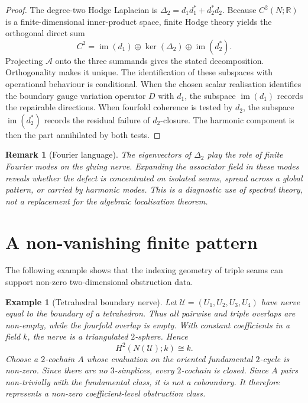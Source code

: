 \documentclass[11pt]{article}
\newtheorem{remark}[theorem]{Remark}
\newtheorem{example}[theorem]{Example}
\newcommand{\im}{\operatorname{im}}
\newcommand{\R}{\mathbb{R}}
\begin{document}
\begin{proof}
The degree-two Hodge Laplacian is \(\Delta_2=d_1d_1^*+d_2^*d_2\). Because \(C^2(N;\R)\) is a finite-dimensional inner-product space, finite Hodge theory yields the orthogonal direct sum
\[
C^2=\im(d_1)\oplus \ker(\Delta_2)\oplus \im(d_2^*).
\]
Projecting \(\mathcal A\) onto the three summands gives the stated decomposition. Orthogonality makes it unique. The identification of these subspaces with operational behaviour is conditional. When the chosen scalar realisation identifies the boundary gauge variation operator \(D\) with \(d_1\), the subspace \(\im(d_1)\) records the repairable directions. When fourfold coherence is tested by \(d_2\), the subspace \(\im(d_2^*)\) records the residual failure of \(d_2\)-closure. The harmonic component is then the part annihilated by both tests.
\end{proof}

\begin{remark}[Fourier language]
The eigenvectors of \(\Delta_2\) play the role of finite Fourier modes on the gluing nerve. Expanding the associator field in these modes reveals whether the defect is concentrated on isolated seams, spread across a global pattern, or carried by harmonic modes. This is a diagnostic use of spectral theory, not a replacement for the algebraic localisation theorem.
\end{remark}

\section{A non-vanishing finite pattern}

The following example shows that the indexing geometry of triple seams can support non-zero two-dimensional obstruction data.

\begin{example}[Tetrahedral boundary nerve]
Let \(\mathcal U=(U_1,U_2,U_3,U_4)\) have nerve equal to the boundary of a tetrahedron. Thus all pairwise and triple overlaps are non-empty, while the fourfold overlap is empty. With constant coefficients in a field \(k\), the nerve is a triangulated \(2\)-sphere. Hence
\[
H^2(N(\mathcal U);k)\cong k.
\]
Choose a \(2\)-cochain \(A\) whose evaluation on the oriented fundamental \(2\)-cycle is non-zero. Since there are no \(3\)-simplices, every \(2\)-cochain is closed. Since \(A\) pairs non-trivially with the fundamental class, it is not a coboundary. It therefore represents a non-zero coefficient-level obstruction class.
\end{example}
\end{document}
